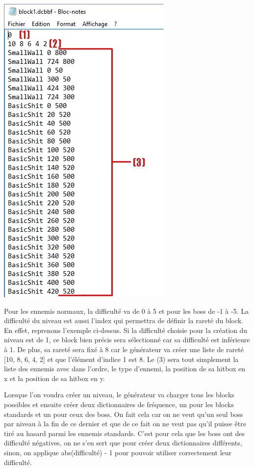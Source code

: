 \documentclass{article}
\begin{document}
\begin{center}
\includegraphics[scale=0.75]{images/explaindcbbf.jpg}
\end{center}

Pour les ennemis normaux, la difficulté va de 0 à 5 et pour les boss de -1 à -5.
La difficulté du niveau est aussi l'index qui permettra de définir la rareté du
block. En effet, reprenons l'exemple ci-dessus. Si la difficulté choisie pour la
création du niveau est de 1, ce block bien précis sera sélectionné car sa
difficulté est inférieure à 1. De plus, sa rareté sera fixé à 8 car le
générateur va créer une liste de rareté [10, 8, 6, 4, 2] et que l'élément
d'indice 1 est 8. Le (3) sera tout simplement la liste des ennemis avec dans
l'ordre, le type d'ennemi, la position de sa hitbox en x et la position de sa
hitbox en y.

Lorsque l'on voudra créer un niveau, le générateur va charger tous les blocks
possibles et ensuite créer deux dictionnaires de fréquence, un pour les blocks
standards et un pour ceux des boss. On fait cela car on ne veut qu'un seul boss
par niveau à la fin de ce dernier et que de ce fait on ne veut pas qu'il puisse
être tiré au hasard parmi les ennemis standards. C'est pour cela que les boss
ont des difficulté négatives, on ne s'en sert que pour créer deux dictionnaires
différents, sinon, on applique abs(difficulté) - 1 pour pouvoir utiliser
correctement leur difficulté.
\end{document}

